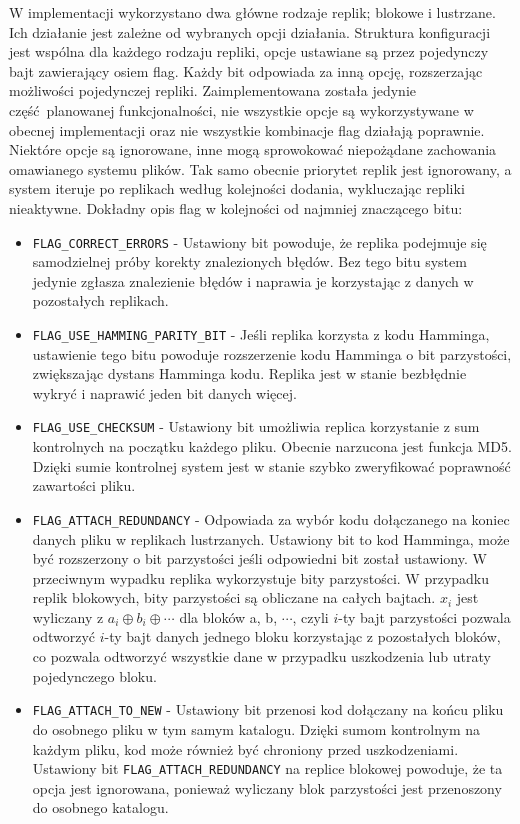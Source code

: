 W implementacji wykorzystano dwa główne rodzaje replik; blokowe i lustrzane. Ich działanie jest zależne od wybranych opcji działania. Struktura konfiguracji jest wspólna dla każdego rodzaju repliki, opcje ustawiane są przez pojedynczy bajt zawierający osiem flag. Każdy bit odpowiada za inną opcję, rozszerzając możliwości pojedynczej repliki. Zaimplementowana została jedynie część planowanej funkcjonalności, nie wszystkie opcje są wykorzystywane w obecnej implementacji oraz nie wszystkie kombinacje flag działają poprawnie. Niektóre opcje są ignorowane, inne mogą sprowokować niepożądane zachowania omawianego systemu plików. Tak samo obecnie priorytet replik jest ignorowany, a system iteruje po replikach według kolejności dodania, wykluczając repliki nieaktywne. Dokładny opis flag w kolejności od najmniej znaczącego bitu:
\begin{itemize}
    \item \verb|FLAG_CORRECT_ERRORS| - Ustawiony bit powoduje, że replika podejmuje się samodzielnej próby korekty znalezionych błędów. Bez tego bitu system jedynie zgłasza znalezienie błędów i naprawia je korzystając z danych w pozostałych replikach.
    \item \verb|FLAG_USE_HAMMING_PARITY_BIT| - Jeśli replika korzysta z kodu Hamminga, ustawienie tego bitu powoduje rozszerzenie kodu Hamminga o bit parzystości, zwiększając dystans Hamminga kodu. Replika jest w stanie bezbłędnie wykryć i naprawić jeden bit danych więcej.
    \item \verb|FLAG_USE_CHECKSUM| - Ustawiony bit umożliwia replica korzystanie z sum kontrolnych na początku każdego pliku. Obecnie narzucona jest funkcja MD5. Dzięki sumie kontrolnej system jest w stanie szybko zweryfikować poprawność zawartości pliku.
    \item \verb|FLAG_ATTACH_REDUNDANCY| - Odpowiada za wybór kodu dołączanego na koniec danych pliku w replikach lustrzanych. Ustawiony bit to kod Hamminga, może być rozszerzony o bit parzystości jeśli odpowiedni bit został ustawiony. W przeciwnym wypadku replika wykorzystuje bity parzystości. W przypadku replik blokowych, bity parzystości są obliczane na całych bajtach. $x_i$ jest wyliczany z $a_i \oplus b_i \oplus \cdots$ dla bloków a, b, $\cdots$, czyli $i$-ty bajt parzystości pozwala odtworzyć $i$-ty bajt danych jednego bloku korzystając z pozostałych bloków, co pozwala odtworzyć wszystkie dane w przypadku uszkodzenia lub utraty pojedynczego bloku. 
    \item \verb|FLAG_ATTACH_TO_NEW| - Ustawiony bit przenosi kod dołączany na końcu pliku do osobnego pliku w tym samym katalogu. Dzięki sumom kontrolnym na każdym pliku, kod może również być chroniony przed uszkodzeniami. Ustawiony bit \verb|FLAG_ATTACH_REDUNDANCY| na replice blokowej powoduje, że ta opcja jest ignorowana, ponieważ wyliczany blok parzystości jest przenoszony do osobnego katalogu.

\end{itemize}
